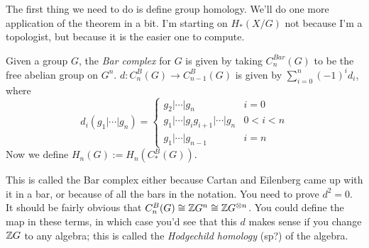 The first thing we need to do is define group homology. We'll do one more application of the theorem in a bit. I'm starting on $H_*(X/G)$ not because I'm a topologist, but because it is the easier one to compute.
\begin{definition}
 Given a group $G$, the \emph{Bar complex} for $G$ is given by taking $C_n^{\mathit{Bar}}(G)$ to be the free abelian group on $G^n$. $d\colon C^B_n(G)\to C^B_{n-1}(G)$ is given by $\sum_{i=0}^n (-1)^i d_i$, where 
 \[
  d_i(g_1|\cdots |g_n)=\begin{cases}
   g_2|\cdots |g_n & i=0\\
   g_1|\cdots | g_ig_{i+1}|\cdots| g_n & 0<i<n\\
   g_1|\cdots | g_{n-1} & i=n
  \end{cases}
 \]
 Now we define $H_n(G):=H_n(C_*^B(G))$.
\end{definition}
This is called the Bar complex either because Cartan and Eilenberg came up with it in a bar, or because of all the bars in the notation. You need to prove $d^2=0$. It should be fairly obvious that $C_n^B(G)\cong \mathbb{Z} G^n\cong \mathbb{Z} G^{\otimes n}$. You could define the map in these terms, in which case you'd see that this $d$ makes sense if you change $\mathbb{Z} G$ to any algebra; this is called the \emph{Hodgechild homology} (sp?) of the algebra.
